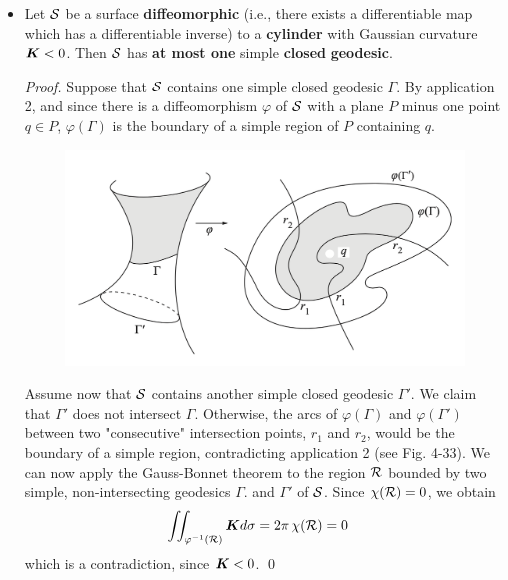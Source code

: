 \documentclass[11pt]{article}
\begin{document}
\begin{itemize}
\item \begin{proposition}
Let ${\mathcal S}$ be a surface \textbf{diffeomorphic} (i.e., there exists a differentiable map which has a differentiable inverse) to a \textbf{cylinder} with Gaussian curvature $\boldsymbol{K} < 0$. Then ${\mathcal S}$ has \textbf{at most one} simple \textbf{closed} \textbf{geodesic}.
\end{proposition}
\begin{proof}
Suppose that ${\mathcal S}$ contains one simple closed geodesic $\Gamma$. By application 2, and since there is a diffeomorphism $\varphi$ of ${\mathcal S}$ with a plane $P$ minus one point $q \in P$, $\varphi(\Gamma)$ is the boundary of a simple region of $P$ containing $q$.

\begin{figure}[htb]
\centering
\begin{minipage}{1\linewidth}
 \centerline{\includegraphics[scale = 0.5]{gauss_bonnet_app_1.png}}
\end{minipage}
\caption{\scriptsize
\textbf{ \citep{do1976differential}}}
\label{fig: gauss_bonnet_app_1}
\end{figure}


Assume now that ${\mathcal S}$ contains another simple closed geodesic $\Gamma'$. We claim that $\Gamma'$ does not intersect $\Gamma$. Otherwise, the arcs of $\varphi(\Gamma)$ and $\varphi(\Gamma')$ between two "consecutive" intersection points, $r_1$ and $r_2$, would be the boundary of a simple region, contradicting application 2 (see Fig. 4-33). We can now apply the Gauss-Bonnet theorem to the region ${\mathcal R}$ bounded by two simple, non-intersecting geodesics $\Gamma$. and $\Gamma'$ of ${\mathcal S}$. Since $\chi({\mathcal R}) = 0$, we obtain
\begin{align*}
\iint_{\varphi^{-1}({\mathcal R})}\boldsymbol{K}d\sigma &= 2\pi\,\chi({\mathcal R}) = 0
\end{align*} which is a contradiction, since $\boldsymbol{K} < 0$. \qed
\end{proof}


\end{itemize}
\end{document}
